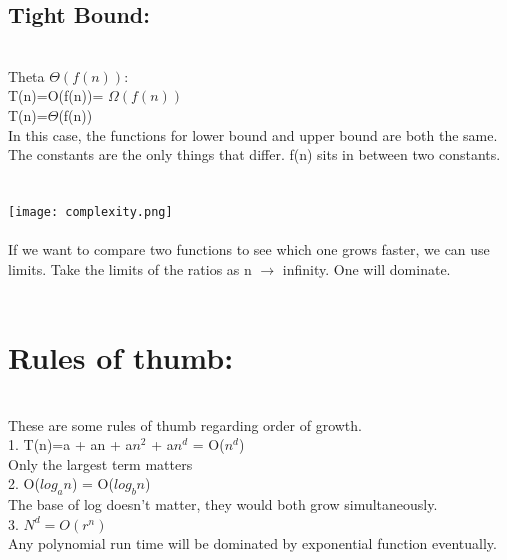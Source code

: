 \subsection{ Tight Bound:}
\\ Theta $\Theta(f(n))$: 
\\	T(n)=O(f(n))= $\Omega(f(n))$
\\	T(n)=$\Theta$(f(n))
\\	In this case, the functions for lower bound and upper bound are both the same. The constants are the only things that differ. f(n) sits in between two constants.
\\ 
\\
\\
\texttt{[image: complexity.png]}
\\	
\\If we want to compare two functions to see which one grows faster, we can use limits. Take the limits of the ratios as n $\to$ infinity. One will dominate.
\\
\\
\section{Rules of thumb:}
\\ These are some rules of thumb regarding order of growth.
\\	1. T(n)=a + an + a$n^2$ + a$n^d$ = O($n^d$)
\\ Only the largest term matters
\\	2. O($log_an$) = O($log_bn$)
\\ The base of log doesn't matter, they would both grow simultaneously.
\\	3. $N^d=O(r^n)$
\\ Any polynomial run time will be dominated by exponential function eventually.
\\
